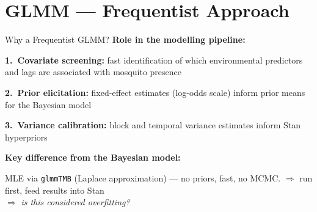 \documentclass[aspectratio=169]{beamer}
\begin{document}




\section{GLMM --- Frequentist Approach}

\begin{frame}{Why a Frequentist GLMM?}
  \textbf{Role in the modelling pipeline:}\vspace{0.3cm}

  \noindent\textbf{1.~Covariate screening:} fast identification of which environmental predictors and lags are associated with mosquito presence\vspace{0.15cm}

  \noindent\textbf{2.~Prior elicitation:} fixed-effect estimates (log-odds scale) inform prior means for the Bayesian model\vspace{0.15cm}

  \noindent\textbf{3.~Variance calibration:} block and temporal variance estimates inform Stan hyperpriors

  \vspace{0.4cm}
  \noindent\textbf{Key difference from the Bayesian model:}\vspace{0.1cm}

  \noindent MLE via \texttt{glmmTMB} (Laplace approximation) --- no priors, fast, no MCMC.
  $\Rightarrow$ run first, feed results into Stan \\
  \vspace{0.4cm}
  \hspace{0.5cm}
  $\Rightarrow$ \textit{is this considered overfitting?}
\end{frame}
\end{document}
